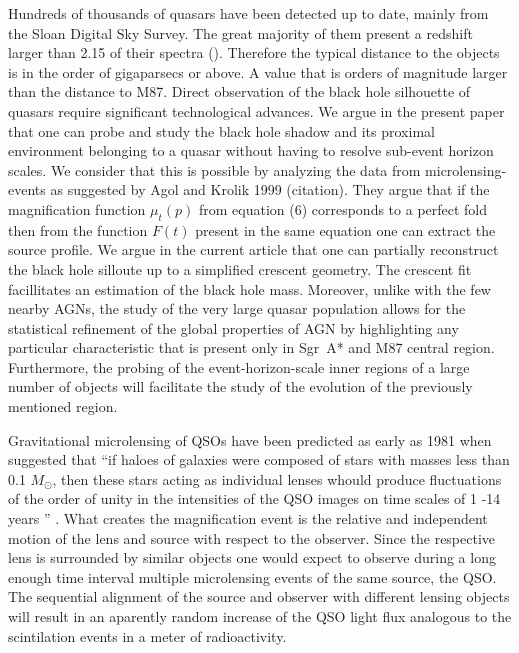 Hundreds of thousands of quasars have been detected up to date, mainly from the Sloan Digital Sky Survey. The great majority of them present a redshift larger than 2.15 of their spectra (\citep{2014A&A...563A..54P}). 
Therefore the typical distance to the objects is in the order of gigaparsecs or above. 
A value that is orders of magnitude larger than the distance to M87. Direct observation of the black hole silhouette of quasars require significant technological advances.
We argue in the present paper that one can probe and study the black hole shadow and its proximal environment belonging to a quasar without having to resolve sub-event horizon scales. 
We consider that this is possible by analyzing the data from microlensing-events as suggested by Agol and Krolik 1999 (citation). They argue that if the magnification function $\mu_t(p)$ from equation (6) corresponds to a perfect fold then from the function $F(t)$ present in the same equation one can extract the source profile. We argue in the current article that one can partially 
reconstruct the black hole silloute up to a simplified crescent geometry. The crescent fit facillitates an estimation of the black hole mass.       
Moreover, unlike with the few nearby AGNs, the study of the very large quasar population allows for the statistical refinement of the global properties of AGN by highlighting any particular
characteristic that is present only in Sgr~A* and M87 central region. 
Furthermore, the probing of the event-horizon-scale inner regions of a large number of objects will facilitate the study of the evolution of the previously mentioned region.     
     
Gravitational microlensing of QSOs have been predicted as early as 1981 when \cite{1981ApJ...243..140G} suggested that 
``if haloes of galaxies were composed of stars with masses less than  0.1 $M_\odot$, then these stars acting as individual lenses whould produce fluctuations of the order of 
unity in the intensities of the QSO images on time scales of 1 -14 years '' . 
What creates the magnification event is the relative and independent motion of the lens and source with respect to the observer.
Since the respective lens is surrounded by similar objects one would expect to observe during a long enough time interval
multiple microlensing events of the same source, the QSO. 
The sequential alignment of the source and observer with different lensing objects will result in an aparently random increase of the QSO light flux analogous to the scintilation events in a meter of radioactivity.

